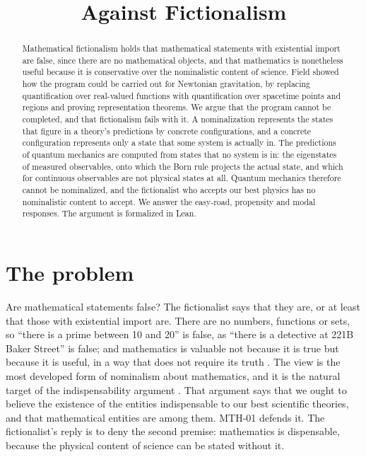 \documentclass{situationist-preprint}
\title{Against Fictionalism}
\begin{document}
\maketitle

\begin{abstract}
Mathematical fictionalism holds that mathematical statements with existential import are false, since there are no mathematical objects, and that mathematics is nonetheless useful because it is conservative over the nominalistic content of science. Field showed how the program could be carried out for Newtonian gravitation, by replacing quantification over real-valued functions with quantification over spacetime points and regions and proving representation theorems. We argue that the program cannot be completed, and that fictionalism fails with it. A nominalization represents the states that figure in a theory's predictions by concrete configurations, and a concrete configuration represents only a state that some system is actually in. The predictions of quantum mechanics are computed from states that no system is in: the eigenstates of measured observables, onto which the Born rule projects the actual state, and which for continuous observables are not physical states at all. Quantum mechanics therefore cannot be nominalized, and the fictionalist who accepts our best physics has no nominalistic content to accept. We answer the easy-road, propensity and modal responses. The argument is formalized in Lean.
\end{abstract}

\section{The problem}

Are mathematical statements false? The fictionalist says that they are, or at least that those with existential import are. There are no numbers, functions or sets, so \enquote{there is a prime between 10 and 20} is false, as \enquote{there is a detective at 221B Baker Street} is false; and mathematics is valuable not because it is true but because it is useful, in a way that does not require its truth \citep{Field1980,Balaguer1998,Leng2010}. The view is the most developed form of nominalism about mathematics, and it is the natural target of the indispensability argument \citep{Quine1948,Putnam1971,Colyvan2001}. That argument says that we ought to believe the existence of the entities indispensable to our best scientific theories, and that mathematical entities are among them. MTH-01 defends it. The fictionalist's reply is to deny the second premise: mathematics is dispensable, because the physical content of science can be stated without it.
\end{document}
